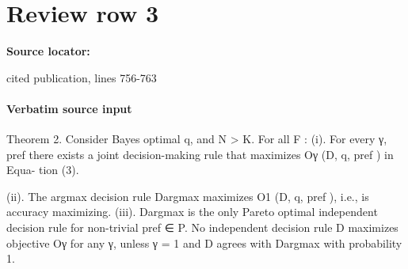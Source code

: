 \documentclass[10pt]{article}
\begin{document}
\section*{Review row 3}
\textbf{Source locator:} {\footnotesize\raggedright cited publication, lines 756-\allowbreak{}763\par}
\paragraph{Verbatim source input}
\begin{ReviewVerbatim}
Theorem 2. Consider Bayes optimal q, and N > K. For all F :
   (i). For every γ, pref there exists a joint decision-making rule that maximizes Oγ (D, q, pref ) in Equa-
        tion (3).

  (ii). The argmax decision rule Dargmax maximizes O1 (D, q, pref ), i.e., is accuracy maximizing.
 (iii). Dargmax is the only Pareto optimal independent decision rule for non-trivial pref ∈ P. No independent
        decision rule D maximizes objective Oγ for any γ, unless γ = 1 and D agrees with Dargmax with
        probability 1.
\end{ReviewVerbatim}
\end{document}
